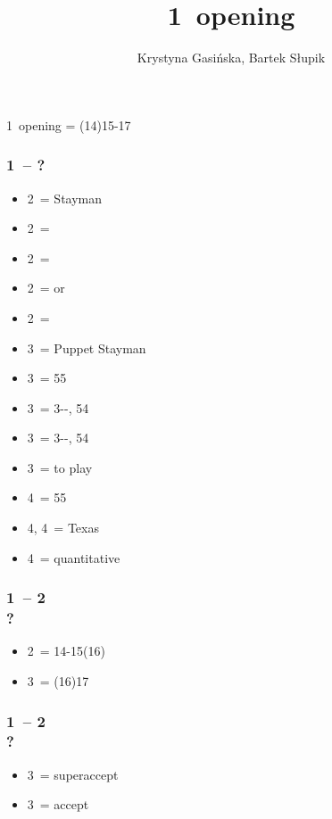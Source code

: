 \documentclass[12pt, a4paper]{article}
\title{1\ntx\ opening}
\author{Krystyna Gasińska, Bartek Słupik}
\begin{document}
\maketitle


1\nt\ opening = (14)15-17 \bal

\subsubsection*{1\ntx\ -- ?}
\begin{itemize}
    \item 2\clubs\ = Stayman
    \item 2\diams\ = \trsf{2\hearts}
    \item 2\hearts\ = \trsf{2\spades}
    \item 2\spades\ = \inv or \trsf{\clubs}
    \item 2\nt\ = \trsf{\diams}
    \item 3\clubs\ = Puppet Stayman
    \item 3\diams\ = 55\minor
    \item 3\hearts\ = 3--\hearts, 54\minor
    \item 3\spades\ = 3--\spades, 54\minor
    \item 3\nt\ = to play
    \item 4\clubs\ = 55\major
    \item 4\diams, 4\hearts\ = Texas
    \item 4\nt\ = quantitative
\end{itemize}

\subsubsection*{1\ntx\ -- 2\spades \\ ?}
\begin{itemize}
    \item 2\nt\ = 14-15(16)
    \item 3\clubs\ = (16)17
\end{itemize}

\subsubsection*{1\ntx\ -- 2\ntx \\ ?}
\begin{itemize}
    \item 3\clubs\ = superaccept
    \item 3\diams\ = accept
\end{itemize}
\end{document}
